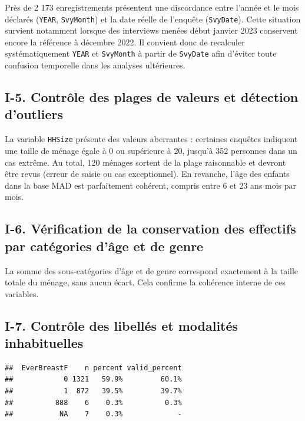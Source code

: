 \documentclass[
]{article}
\begin{document}
Près de 2 173 enregistrements présentent une discordance entre l'année
et le mois déclarés (\texttt{YEAR}, \texttt{SvyMonth}) et la date réelle
de l'enquête (\texttt{SvyDate}). Cette situation survient notamment
lorsque des interviews menées début janvier 2023 conservent encore la
référence à décembre 2022. Il convient donc de recalculer
systématiquement \texttt{YEAR} et \texttt{SvyMonth} à partir de
\texttt{SvyDate} afin d'éviter toute confusion temporelle dans les
analyses ultérieures.

\hypertarget{i-5.-contruxf4le-des-plages-de-valeurs-et-duxe9tection-doutliers}{%
\subsection{I-5. Contrôle des plages de valeurs et détection
d'outliers}\label{i-5.-contruxf4le-des-plages-de-valeurs-et-duxe9tection-doutliers}}

La variable \texttt{HHSize} présente des valeurs aberrantes : certaines
enquêtes indiquent une taille de ménage égale à 0 ou supérieure à 20,
jusqu'à 352 personnes dans un cas extrême. Au total, 120 ménages sortent
de la plage raisonnable et devront être revus (erreur de saisie ou cas
exceptionnel). En revanche, l'âge des enfants dans la base MAD est
parfaitement cohérent, compris entre 6 et 23 ans mois par mois.

\hypertarget{i-6.-vuxe9rification-de-la-conservation-des-effectifs-par-catuxe9gories-duxe2ge-et-de-genre}{%
\subsection{I-6. Vérification de la conservation des effectifs par
catégories d'âge et de
genre}\label{i-6.-vuxe9rification-de-la-conservation-des-effectifs-par-catuxe9gories-duxe2ge-et-de-genre}}

La somme des sous-catégories d'âge et de genre correspond exactement à
la taille totale du ménage, sans aucun écart. Cela confirme la cohérence
interne de ces variables.

\hypertarget{i-7.-contruxf4le-des-libelluxe9s-et-modalituxe9s-inhabituelles}{%
\subsection{I-7. Contrôle des libellés et modalités
inhabituelles}\label{i-7.-contruxf4le-des-libelluxe9s-et-modalituxe9s-inhabituelles}}

\begin{verbatim}
##  EverBreastF    n percent valid_percent
##            0 1321   59.9%         60.1%
##            1  872   39.5%         39.7%
##          888    6    0.3%          0.3%
##           NA    7    0.3%             -
\end{verbatim}
\end{document}
